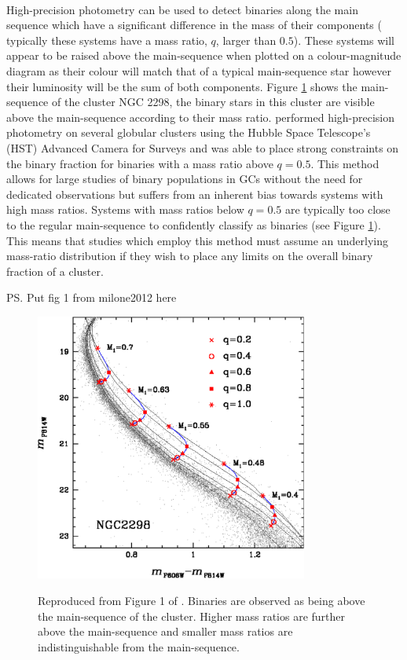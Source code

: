 \paragraph{}
High-precision photometry can be used to detect binaries along the main sequence which have a
significant difference in the mass of their components ( typically these systems have a mass ratio,
$q$, larger than $0.5$). These systems will appear to be raised above the main-sequence when plotted
on a colour-magnitude diagram as their colour will match that of a typical main-sequence star
however their luminosity will be the sum of both components. Figure
\ref{fig:1/main_sequence_binaries} shows the main-sequence of the cluster NGC 2298, the binary stars
in this cluster are visible above the main-sequence according to their mass ratio.
\citet{Milone2012} performed high-precision photometry on several globular clusters using the Hubble
Space Telescope's (HST) Advanced Camera for Surveys and was able to place strong constraints on the
binary fraction for binaries with a mass ratio above $q=0.5$. This method allows for large studies
of binary populations in GCs without the need for dedicated observations but suffers from an
inherent bias towards systems with high mass ratios. Systems with mass ratios below $q=0.5$ are
typically too close to the regular main-sequence to confidently classify as binaries (see Figure
\ref{fig:1/main_sequence_binaries}). This means that studies which employ this method must assume an
underlying mass-ratio distribution if they wish to place any limits on the overall binary fraction
of a cluster.

\ps{Put fig 1 from milone2012 here}

\begin{figure}
	\centering
	\includegraphics[width=0.8\textwidth]{"./figures/main_sequence_binaries.pdf"}
	\label{fig:1/main_sequence_binaries}
	\caption{Reproduced from Figure 1 of \citet{Milone2012}. Binaries are observed as being above the
		main-sequence of the cluster. Higher mass ratios are further above the main-sequence
		and smaller mass ratios are indistinguishable from the main-sequence.}
\end{figure}


